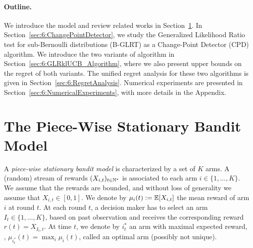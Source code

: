 

\paragraph{Outline.}
%
We introduce the model and review related works in Section~\ref{sec:6:BanditSetting}. In Section~\ref{sec:6:ChangePointDetector}, we study the Generalized Likelihood Ratio test for sub-Bernoulli distributions (B-GLRT) as a Change-Point Detector (CPD) algorithm.
We introduce the two variants of \GLRklUCB{} algorithm in Section~\ref{sec:6:GLRklUCB_Algorithm}, where we also present upper bounds on the regret of both variants.
The unified regret analysis for these two algorithms is given in Section~\ref{sec:6:RegretAnalysis}.
Numerical experiments are presented in Section~\ref{sec:6:NumericalExperiments}, with more details in the Appendix.



\section{The Piece-Wise Stationary Bandit Model}
\label{sec:6:BanditSetting}

A \emph{piece-wise stationary bandit model} is characterized by a set of $K$ arms.
A (random) stream of rewards $(X_{i,t})_{t\in\mathbb{N}^*}$ is associated to each arm $i \in \{1,\dots,K\}$. We assume that the rewards are bounded, and without loss of generality we assume that $X_{i,t} \in [0,1]$. We denote by $\mu_{i}(t) :=  \mathbb{E}[X_{i,t}]$ the mean reward of arm $i$ at round $t$. At each round $t$, a decision maker has to select an arm $I_t\in\{1,\dots,K\}$, based on past observation and receives the corresponding reward $r(t) = X_{I_t,t}$. At time $t$, we denote by $i_t^*$ an arm with maximal expected reward, \ie, $\mu_{i_t^*}(t) = \max_i \mu_i(t)$, called an optimal arm (possibly not unique).

